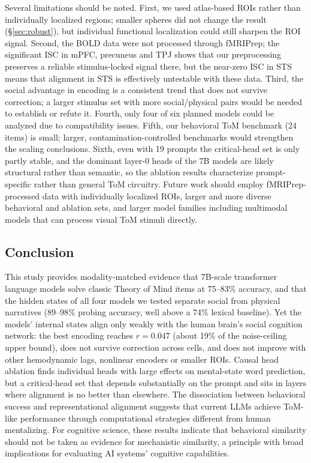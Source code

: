 \documentclass[conference]{IEEEtran}
\begin{document}
Several limitations should be noted. First, we used atlas-based ROIs rather than individually localized regions; smaller spheres did not change the result (\S\ref{sec:robust}), but individual functional localization could still sharpen the ROI signal. Second, the BOLD data were not processed through fMRIPrep; the significant ISC in mPFC, precuneus and TPJ shows that our preprocessing preserves a reliable stimulus-locked signal there, but the near-zero ISC in STS means that alignment in STS is effectively untestable with these data. Third, the social advantage in encoding is a consistent trend that does not survive correction; a larger stimulus set with more social/physical pairs would be needed to establish or refute it. Fourth, only four of six planned models could be analyzed due to compatibility issues. Fifth, our behavioral ToM benchmark (24 items) is small; larger, contamination-controlled benchmarks would strengthen the scaling conclusions. Sixth, even with 19 prompts the critical-head set is only partly stable, and the dominant layer-0 heads of the 7B models are likely structural rather than semantic, so the ablation results characterize prompt-specific rather than general ToM circuitry. Future work should employ fMRIPrep-processed data with individually localized ROIs, larger and more diverse behavioral and ablation sets, and larger model families including multimodal models that can process visual ToM stimuli directly.

\subsection{Conclusion}

This study provides modality-matched evidence that 7B-scale transformer language models solve classic Theory of Mind items at 75--83\% accuracy, and that the hidden states of all four models we tested separate social from physical narratives (89--98\% probing accuracy, well above a 74\% lexical baseline). Yet the models' internal states align only weakly with the human brain's social cognition network: the best encoding reaches $r = 0.047$ (about 19\% of the noise-ceiling upper bound), does not survive correction across cells, and does not improve with other hemodynamic lags, nonlinear encoders or smaller ROIs. Causal head ablation finds individual heads with large effects on mental-state word prediction, but a critical-head set that depends substantially on the prompt and sits in layers where alignment is no better than elsewhere. The dissociation between behavioral success and representational alignment suggests that current LLMs achieve ToM-like performance through computational strategies different from human mentalizing. For cognitive science, these results indicate that behavioral similarity should not be taken as evidence for mechanistic similarity, a principle with broad implications for evaluating AI systems' cognitive capabilities.
\end{document}
